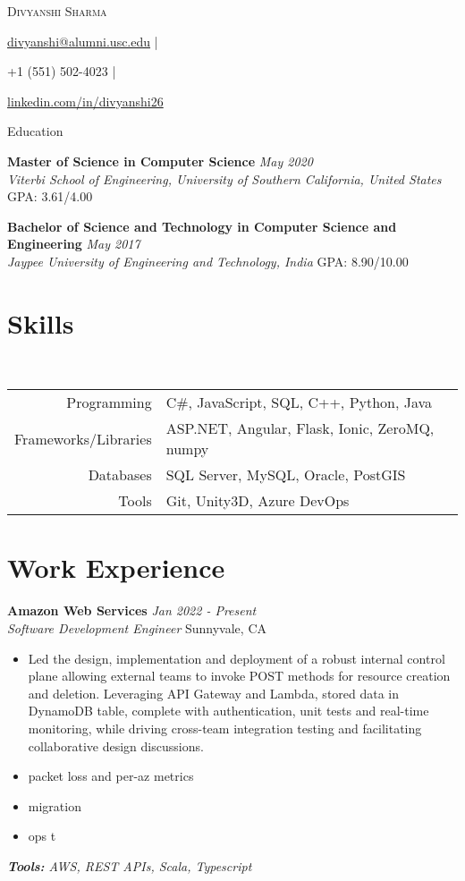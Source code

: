 \documentclass[letterpaper,10pt]{article}
\newcommand{\organization}[4]{
    \vspace{1.5pt}
    \textbf{#1} \hfill{\emph{#2}} \\
    \emph{#3} \hfill{#4} \\
    \vspace{3pt}
}
\newcommand{\toolsused}[1]{
    \vspace{1.5pt}
    \emph{#1}\\
    \vspace{3pt}
}
\newcommand{\skills}[4]{
    \vspace{-2pt}
    \ \ \ \ \ \ \ \ \ \ \ 
    \begin{tabular}{r!{\color{burgundy}\vrule}l}
          Programming & #1 \\
          Frameworks/Libraries & #2 \\
          Databases & #3 \\
          Tools & #4
    \end{tabular}
    \vspace{4pt}
}
\newcommand{\bulletsBegin}{
    \vspace{1pt}
    \begin{minipage}{17.6cm}
    \begin{itemize}[leftmargin=0.6cm]
    \setlength\itemsep{-0.1em}
}
\newcommand{\bulletsEnd}{
    \end{itemize}\vspace{0pt}
    \end{minipage}
}
\newcommand{\myEmail}[1]{
    \href{mailto:#1}{#1} |
}
\newcommand{\myPhone}[1]{
    {#1} |
}
\newcommand{\mySite}[1]{
    \href{https://linkedin.com/in/divyanshi26}{#1}
}
\newcommand{\myName}[5]{
    \begin{center}
        {\huge{\color{burgundy}\scshape{#1}}} \\
        \vspace{6pt}
        \myEmail{#2}
        \myPhone{#3}
        \mySite{#4}
    \end{center}
    \vspace{-4pt}
}
\begin{document}
    \myName{Divyanshi Sharma}{divyanshi@alumni.usc.edu}{+1 (551) 502-4023}{linkedin.com/in/divyanshi26}

    \section{Education}
        
    \organization{Master of Science in Computer Science}{May 2020}
        {Viterbi School of Engineering, University of Southern California, United States}{GPA: 3.61/4.00}

	\organization{Bachelor of Science and Technology in Computer Science and Engineering}{May 2017}
        {Jaypee University of Engineering and Technology, India}{GPA: 8.90/10.00}
	\vspace{6pt}
    
    \section{Skills}
    
    \skills
        {C\#, JavaScript, SQL, C++, Python, Java}  %
        {ASP.NET, Angular, Flask, Ionic, ZeroMQ, numpy}  %
        {SQL Server, MySQL, Oracle, PostGIS}  %
        {Git, Unity3D, Azure DevOps}  %

    \section{Work Experience}

    	\organization{Amazon Web Services}{Jan 2022 - Present}
        {Software Development Engineer}{Sunnyvale, CA}
        \bulletsBegin
            \item Led the design, implementation and deployment of a robust internal control plane allowing external teams to invoke POST methods for resource creation and deletion. Leveraging API Gateway and Lambda, stored data in DynamoDB table, complete with authentication, unit tests and real-time monitoring, while driving cross-team integration testing and facilitating collaborative design discussions.
	    \vspace{-2pt}
            \item packet loss and per-az metrics
            \item migration
            \vspace{-2pt}
            \item ops t
            \vspace{-2pt}
        \bulletsEnd
        \vspace{-4pt}
        \toolsused{\textbf{Tools:} AWS, REST APIs, Scala, Typescript}
\end{document}
